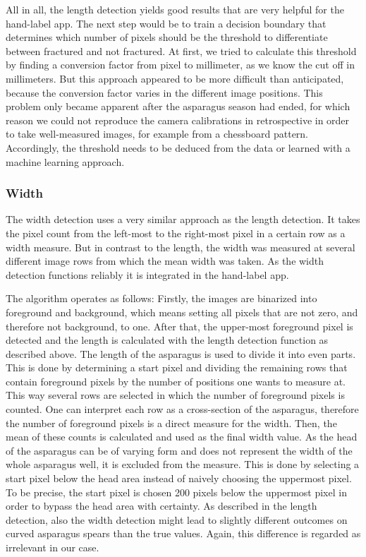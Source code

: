 \bigskip
All in all, the length detection yields good results that are very helpful for the hand-label app. The next step would be to train a decision boundary that determines which number of pixels should be the threshold to differentiate between fractured and not fractured. At first, we tried to calculate this threshold by finding a conversion factor from pixel to millimeter, as we know the cut off in millimeters. But this approach appeared to be more difficult than anticipated, because the conversion factor varies in the different image positions. This problem only became apparent after the asparagus season had ended, for which reason we could not reproduce the camera calibrations in retrospective in order to take well-measured images, for example from a chessboard pattern. Accordingly, the threshold needs to be deduced from the data or learned with a machine learning approach.

\subsubsection{Width}
\label{subsec:Width}

The width detection uses a very similar approach as the length detection. It takes the pixel count from the left-most to the right-most pixel in a certain row as a width measure. But in contrast to the length, the width was measured at several different image rows from which the mean width was taken. As the width detection functions reliably it is integrated in the hand-label app.

\bigskip
The algorithm operates as follows: Firstly, the images are binarized into foreground and background, which means setting all pixels that are not zero, and therefore not background, to one. After that, the upper-most foreground pixel is detected and the length is calculated with the length detection function as described above. The length of the asparagus is used to divide it into even parts. This is done by determining a start pixel and dividing the remaining rows that contain foreground pixels by the number of positions one wants to measure at. This way several rows are selected in which the number of foreground pixels is counted. One can interpret each row as a cross-section of the asparagus, therefore the number of foreground pixels is a direct measure for the width. Then, the mean of these counts is calculated and used as the final width value. As the head of the asparagus can be of varying form and does not represent the width of the whole asparagus well, it is excluded from the measure. This is done by selecting a start pixel below the head area instead of naively choosing the uppermost pixel. To be precise, the start pixel is chosen 200 pixels below the uppermost pixel in order to bypass the head area with certainty. As described in the length detection, also the width detection might lead to slightly different outcomes on curved asparagus spears than the true values. Again, this difference is regarded as irrelevant in our case.

